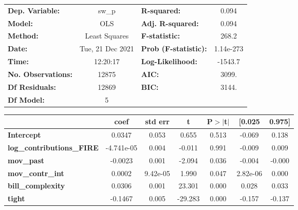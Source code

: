 \begin{center}
\begin{tabular}{lclc}
\toprule
\textbf{Dep. Variable:}           &      sw\_p       & \textbf{  R-squared:         } &     0.094   \\
\textbf{Model:}                   &       OLS        & \textbf{  Adj. R-squared:    } &     0.094   \\
\textbf{Method:}                  &  Least Squares   & \textbf{  F-statistic:       } &     268.2   \\
\textbf{Date:}                    & Tue, 21 Dec 2021 & \textbf{  Prob (F-statistic):} & 1.14e-273   \\
\textbf{Time:}                    &     12:20:17     & \textbf{  Log-Likelihood:    } &   -1543.7   \\
\textbf{No. Observations:}        &       12875      & \textbf{  AIC:               } &     3099.   \\
\textbf{Df Residuals:}            &       12869      & \textbf{  BIC:               } &     3144.   \\
\textbf{Df Model:}                &           5      & \textbf{                     } &             \\
\bottomrule
\end{tabular}
\begin{tabular}{lcccccc}
                                  & \textbf{coef} & \textbf{std err} & \textbf{t} & \textbf{P$> |$t$|$} & \textbf{[0.025} & \textbf{0.975]}  \\
\midrule
\textbf{Intercept}                &       0.0347  &        0.053     &     0.655  &         0.513        &       -0.069    &        0.138     \\
\textbf{log\_contributions\_FIRE} &   -4.741e-05  &        0.004     &    -0.011  &         0.991        &       -0.009    &        0.009     \\
\textbf{mov\_past}                &      -0.0023  &        0.001     &    -2.094  &         0.036        &       -0.004    &       -0.000     \\
\textbf{mov\_contr\_int}          &       0.0002  &     9.42e-05     &     1.990  &         0.047        &     2.82e-06    &        0.000     \\
\textbf{bill\_complexity}         &       0.0306  &        0.001     &    23.301  &         0.000        &        0.028    &        0.033     \\
\textbf{tight}                    &      -0.1467  &        0.005     &   -29.283  &         0.000        &       -0.157    &       -0.137     \\

\end{tabular}
\end{center}
